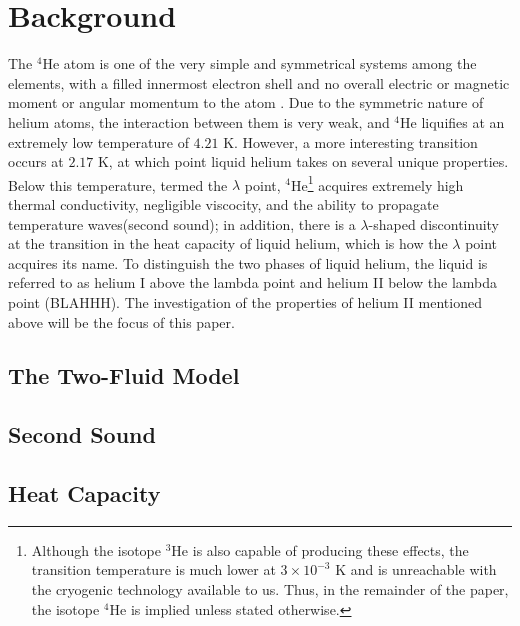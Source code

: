 
\section{Background}\label{background}

The $^4$He atom is one of the very simple and symmetrical systems
among the elements, with a filled innermost electron shell and no
overall electric or magnetic moment or angular momentum to the atom
\cite{atkins}. Due to the symmetric nature of helium atoms, the
interaction between them is very weak, and $^4$He liquifies at an
extremely low temperature of $4.21$ K. However, a more interesting
transition occurs at $2.17$ K, at which point liquid helium takes on
several unique properties. Below this temperature, termed the
$\lambda$ point, $^4$He\footnote{Although the isotope $^3$He is also
  capable of producing these effects, the transition temperature is
  much lower at $3\times 10^{-3}$ K and is unreachable with the
  cryogenic technology available to us. Thus, in the remainder of the
  paper, the isotope $^4$He is implied unless stated otherwise.}
acquires extremely high thermal conductivity, negligible viscocity,
and the ability to propagate temperature waves(second sound); in
addition, there is a $\lambda$-shaped discontinuity at the transition
in the heat capacity of liquid helium, which is how the $\lambda$
point acquires its name. To distinguish the two phases of liquid
helium, the liquid is referred to as helium I above the lambda point
and helium II below the lambda point (BLAHHH). The investigation of
the properties of helium II mentioned above will be the focus of this
paper.

\subsection{The Two-Fluid Model}


\begin{figure}[ht]
\begin{center}

\caption{\small{}}
\label{figure:e_nu}
\end{center}
\end{figure}


\subsection{Second Sound}
\subsection{Heat Capacity}
